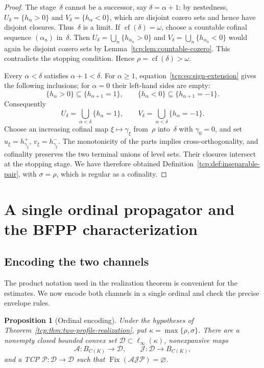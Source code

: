 \documentclass[preprint,12pt,nopreprintline]{elsarticle}
\newtheorem{proposition}[theorem]{Proposition}
\theoremstyle{definition}
\theoremstyle{remark}
\numberwithin{equation}{section}
\begin{document}
\begin{proof}
The stage~$\delta$ cannot be a successor, say $\delta=\alpha+1$: by nestedness, $U_\delta=\{h_\alpha>0\}$ and $V_\delta=\{h_\alpha<0\}$, which are disjoint cozero sets and hence have disjoint closures. Thus~$\delta$ is a limit. If $\operatorname{cf}(\delta)=\omega$, choose a countable cofinal sequence $(\alpha_n)$ in~$\delta$. Then $U_\delta=\bigcup_n\{h_{\alpha_n}>0\}$ and $V_\delta=\bigcup_n\{h_{\alpha_n}<0\}$ would again be disjoint cozero sets by Lemma~\ref{tcp:lem:countable-cozero}. This contradicts the stopping condition. Hence $\rho=\operatorname{cf}(\delta)>\omega$.

Every $\alpha<\delta$ satisfies $\alpha+1<\delta$. For $\alpha\ge1$, equation~\eqref{tcp:eq:sign-extension} gives the following inclusions; for $\alpha=0$ their left-hand sides are empty:
\[
 \{h_\alpha>0\}\subseteq\{h_{\alpha+1}=1\},\qquad
 \{h_\alpha<0\}\subseteq\{h_{\alpha+1}=-1\}.
\]
Consequently
\[
 U_\delta=\bigcup_{\alpha<\delta}\{h_\alpha=1\},\qquad
 V_\delta=\bigcup_{\alpha<\delta}\{h_\alpha=-1\}.
\]
Choose an increasing cofinal map $\xi\mapsto\gamma_\xi$ from~$\rho$ into~$\delta$ with $\gamma_0=0$, and set
$u_\xi=h_{\gamma_\xi}^+$, $v_\xi=h_{\gamma_\xi}^-$. The monotonicity of the parts implies cross-orthogonality, and
cofinality preserves the two terminal unions of level sets. Their closures intersect at the stopping stage. We have therefore
obtained Definition~\ref{tcp:def:inseparable-pair}, with $\sigma=\rho$, which is regular as a cofinality.
\end{proof}


\section{A single ordinal propagator and the BFPP characterization}
\label{sec:conclusion}
\label{tcp:subsec:main-theorem}

\subsection{Encoding the two channels}

The product notation used in the realization theorem is convenient for the estimates. We now encode both channels in a single ordinal and check the precise envelope rules.

\begin{proposition}[Ordinal encoding]
\label{tcp:prop:encoding}
Under the hypotheses of Theorem~\ref{tcp:thm:two-profile-realization}, put $\kappa=\max\{\rho,\sigma\}$. There are a nonempty closed bounded convex set $\mathcal D\subset\ell_\infty(\kappa)$, nonexpansive maps
\[
 \mathcal A:B_{C(K)}\to\mathcal D,
 \qquad \mathcal J:\mathcal D\to B_{C(K)},
\]
and a TCP $\mathscr P:\mathcal D\to\mathcal D$ such that $\operatorname{Fix}(\mathcal A\mathcal J\mathscr P)=\varnothing$.
\end{proposition}
\end{document}

